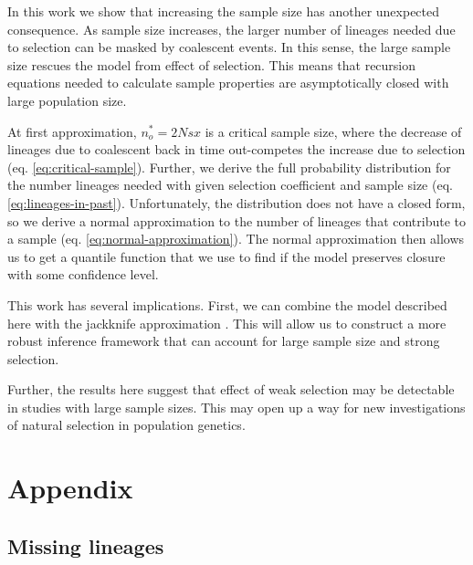 \documentclass[review]{elsarticle}
\begin{document}
In this work we show that increasing the sample size has another unexpected consequence. As sample
size increases, the larger number of lineages needed due to selection can be masked by coalescent
events. In this sense, the large sample size rescues the model from effect of selection. This means
that recursion equations needed to calculate sample properties are asymptotically closed with large
population size.

At first approximation, $n_o^*=2Nsx$ is a critical sample size, where the decrease of lineages due to
coalescent back in time out-competes the increase due to selection (eq. \eqref{eq:critical-sample}).
Further, we derive the full probability distribution for the number lineages needed with given
selection coefficient and sample size (eq. \eqref{eq:lineages-in-past}). Unfortunately, the
distribution does not have a closed form, so we derive a normal approximation to the number of
lineages that contribute to a sample (eq. \eqref{eq:normal-approximation}). The normal approximation
then allows us to get a quantile function that we use to find if the model preserves closure with
some confidence level.

This work has several implications. First, we can combine the model described here with the
jackknife approximation \citep{JouganousEtAl2017}. This will allow us to construct a more robust
inference framework that can account for large sample size and strong selection.

Further, the results here suggest that effect of weak selection may be detectable in studies with
large sample sizes. This may open up a way for new investigations of natural selection in population
genetics.



\section{Appendix}
\renewcommand{\thefigure}{S\arabic{figure}}
\setcounter{figure}{0}

\subsection{Missing lineages}
\end{document}
